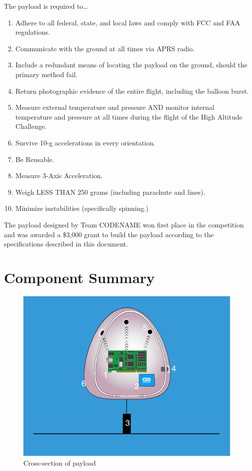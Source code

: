 \documentclass[english]{report}
\begin{document}
The payload is required to\dots
\begin{enumerate}
\item Adhere to all federal, state, and local laws and comply with FCC and
FAA regulations.
\item Communicate with the ground at all times via APRS radio.\label{req:APRS}
\item Include a redundant means of locating the payload on the ground, should the primary method fail.\label{req:redundant_location}
\item Return photographic evidence of the entire flight, including the balloon
burst.
\item Measure external temperature and pressure AND monitor internal temperature
and pressure at all times during the flight\label{req:sensors} of the High Altitude Challenge.
\item Survive 10-g accelerations in every orientation.
\item Be Reusable.
\item Measure 3-Axis Acceleration.\label{req:accelerometer}
\item Weigh LESS THAN 250 grams (including parachute and lines).
\item Minimize instabilities (specifically spinning.)\label{req:spinning}
\end{enumerate}
The payload designed by Team CODENAME won first place in the competition
and was awarded a \$3,000 grant to build the payload according to the specifications described in this document.


\section{Component Summary}
\begin{figure}[H]
\begin{centering}
\includegraphics[scale=0.3]{./images/karah_physics_2-1}
\par\end{centering}
\caption{Cross-section of payload}
\end{figure}
\end{document}
